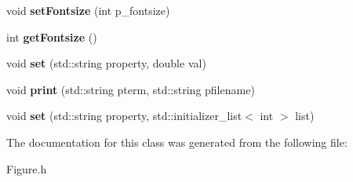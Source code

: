 \begin{DoxyCompactItemize}
\item 
\hypertarget{classkeycpp_1_1_figure_ab8d777d1b44e242b104350093ef09543}{void {\bfseries set\-Fontsize} (int p\-\_\-fontsize)}\label{classkeycpp_1_1_figure_ab8d777d1b44e242b104350093ef09543}

\item 
\hypertarget{classkeycpp_1_1_figure_a6c1e59c4e8288e3880bde70db3723037}{int {\bfseries get\-Fontsize} ()}\label{classkeycpp_1_1_figure_a6c1e59c4e8288e3880bde70db3723037}

\item 
\hypertarget{classkeycpp_1_1_figure_a7375fe8611759fda180d626f91eab510}{void {\bfseries set} (std\-::string property, double val)}\label{classkeycpp_1_1_figure_a7375fe8611759fda180d626f91eab510}

\item 
\hypertarget{classkeycpp_1_1_figure_ac6d1881c6dc996eb508adf2126905d38}{void {\bfseries print} (std\-::string pterm, std\-::string pfilename)}\label{classkeycpp_1_1_figure_ac6d1881c6dc996eb508adf2126905d38}

\item 
\hypertarget{classkeycpp_1_1_figure_af82ed243d2b4f59f5e01566eb03cf9d3}{void {\bfseries set} (std\-::string property, std\-::initializer\-\_\-list$<$ int $>$ list)}\label{classkeycpp_1_1_figure_af82ed243d2b4f59f5e01566eb03cf9d3}

\end{DoxyCompactItemize}


The documentation for this class was generated from the following file\-:\begin{DoxyCompactItemize}
\item 
Figure.\-h\end{DoxyCompactItemize}
